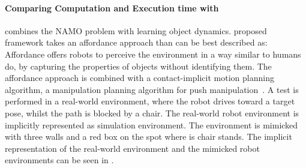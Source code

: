 




\paragraph{Comparing Computation and Execution time with \citeauthor{wang_affordancebased_2020}}
\citeauthor{wang_affordancebased_2020} combines the \ac{NAMO} problem with learning object dynamics. \citeauthor{wang_affordancebased_2020} proposed framework takes an affordance approach than can be best described as: Affordance offers robots to perceive the environment in a way similar to humans do, by capturing the properties of objects without identifying them. The affordance approach is combined with a contact-implicit motion planning algorithm, a manipulation planning algorithm for push manipulation~\cite{wang_affordancebased_2020}. A test is performed in a real-world environment, where the robot drives toward a target pose, whilst the path is blocked by a chair. The real-world robot environment is implicitly represented as simulation environment. The environment is mimicked with three walls and a red box on the spot where is chair stands. The implicit representation of the real-world environment and the mimicked robot environments can be seen in .\bs

